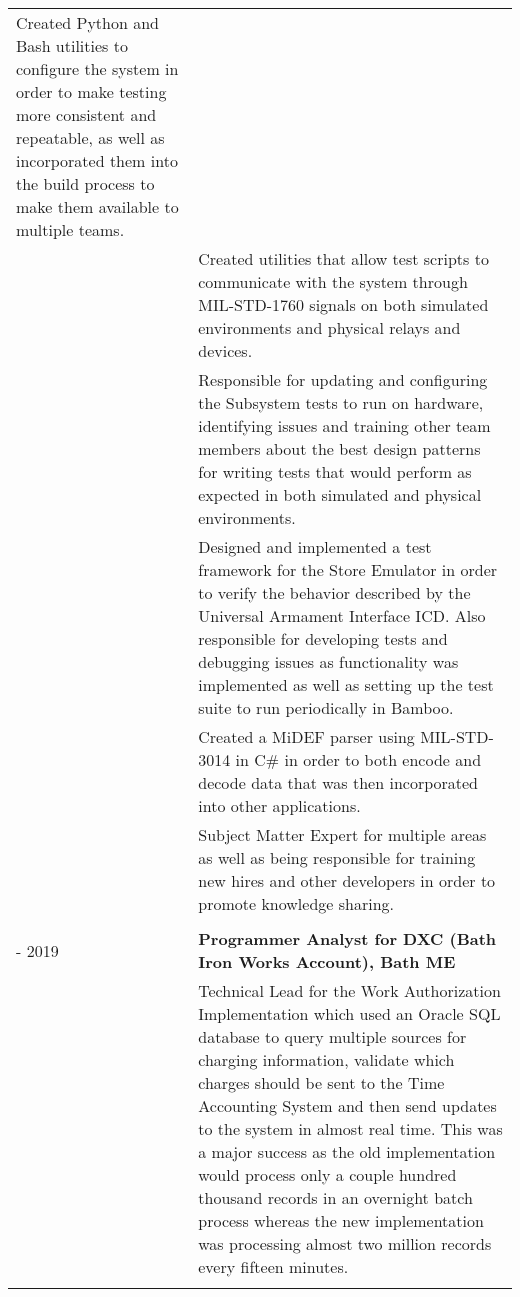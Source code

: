 \documentclass[11pt, letterpaper]{article}
\begin{document}
\begin{longtable}{p{1in}|p{6in}}
        Created Python and Bash utilities to configure the system in order to make testing more consistent and repeatable, as well as incorporated them into the build process to make them available to multiple teams. \vspace{0.2cm} \\&
        Created utilities that allow test scripts to communicate with the system through MIL-STD-1760 signals on both simulated environments and physical relays and devices. \vspace{0.2cm} \\&
        Responsible for updating and configuring the Subsystem tests to run on hardware, identifying issues and training other team members about the best design patterns for writing tests that would perform as expected in both simulated and physical environments. \vspace{0.2cm} \\&
        Designed and implemented a test framework for the Store Emulator in order to verify the behavior described by the Universal Armament Interface ICD. Also responsible for developing tests and debugging issues as functionality was implemented as well as setting up the test suite to run periodically in Bamboo. \vspace{0.2cm} \\&
        Created a MiDEF parser using MIL-STD-3014 in C\# in order to both encode and decode data that was then incorporated into other applications. \vspace{0.2cm} \\&
	    Subject Matter Expert for multiple areas as well as being responsible for training new hires and other developers in order to promote knowledge sharing. \\
    \multicolumn{2}{c}{}\\
	\centering 2015 - 2019 & \textbf{Programmer Analyst for DXC (Bath Iron Works Account), Bath ME} \vspace{0.1cm} \\&
        Technical Lead for the Work Authorization Implementation which used an Oracle SQL database to query multiple sources for charging information, validate which charges should be sent to the Time Accounting System and then send updates to the system in almost real time.
        This was a major success as the old implementation would process only a couple hundred thousand records in an overnight batch process whereas the new implementation was processing almost two million records every fifteen minutes. \vspace{0.2cm} \\&

\end{longtable}
\end{document}
